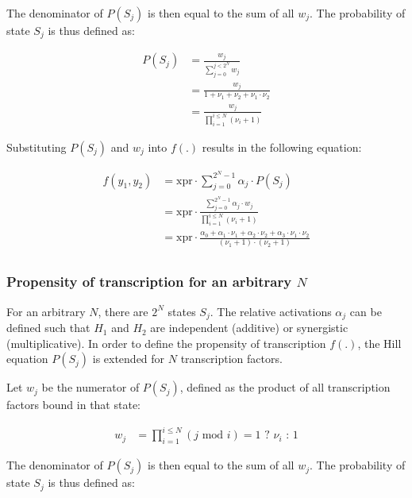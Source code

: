 \documentclass[
  table,
  10pt,
  a4paper]{article}
\begin{document}
The denominator of \(P(S_j)\) is then equal to the sum of all \(w_j\).
The probability of state \(S_j\) is thus defined as:

\begin{align}
    P(S_j) & = \frac{w_j}{\sum_{j=0}^{j < 2^N} w_j} \\
               & = \frac{w_j}{1 + \nu_1 + \nu_2 + \nu_1 \cdot \nu_2} \\
               & = \frac{w_j}{\prod_{i=1}^{i \leq N} (\nu_i + 1)}
\end{align}

Substituting \(P(S_j)\) and \(w_j\) into \(f(.)\) results in the
following equation:

\begin{align}
f(y_1, y_2) & = \text{xpr} \cdot \sum_{j = 0}^{2^N - 1} \alpha_j \cdot P(S_j) \\
 & = \text{xpr} \cdot \frac{\sum_{j = 0}^{2^N - 1} \alpha_j \cdot w_j}{\prod_{i=1}^{i \leq N} (\nu_i + 1)} \\
 & = \text{xpr} \cdot \frac{\alpha_0 + \alpha_1 \cdot \nu_1 + \alpha_2 \cdot \nu_2 + \alpha_3 \cdot \nu_1 \cdot \nu_2}{(\nu_1 + 1) \cdot (\nu_2 + 1)} \\
\end{align}

\hypertarget{propensity-of-transcription-for-an-arbitrary-n}{%
\subsubsection{\texorpdfstring{Propensity of transcription for an
arbitrary
\(N\)}{Propensity of transcription for an arbitrary N}}\label{propensity-of-transcription-for-an-arbitrary-n}}

For an arbitrary \(N\), there are \(2^N\) states \(S_j\). The relative
activations \(\alpha_j\) can be defined such that \(H_1\) and \(H_2\)
are independent (additive) or synergistic (multiplicative). In order to
define the propensity of transcription \(f(.)\), the Hill equation
\(P(S_j)\) is extended for \(N\) transcription factors.

Let \(w_j\) be the numerator of \(P(S_j)\), defined as the product of
all transcription factors bound in that state:

\begin{align}
  w_j & = \prod_{i=1}^{i \leq N} (j \text{ mod } i) = 1 \text{ ? } \nu_i \text{ : } 1
\end{align}

The denominator of \(P(S_j)\) is then equal to the sum of all \(w_j\).
The probability of state \(S_j\) is thus defined as:
\end{document}
